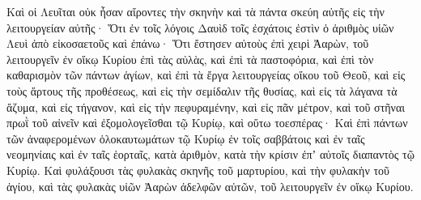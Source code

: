 {Καὶ οἱ Λευῖται οὐκ ἦσαν αἴροντες τὴν σκηνὴν καὶ τὰ πάντα σκεύη αὐτῆς εἰς τὴν λειτουργείαν αὐτῆς·
Ὅτι ἐν τοῖς λόγοις Δαυὶδ τοῖς ἐσχάτοις ἐστὶν ὁ ἀριθμὸς υἱῶν Λευὶ ἀπὸ εἰκοσαετοῦς καὶ ἐπάνω·
Ὅτι ἔστησεν αὐτοὺς ἐπὶ χειρὶ Ἀαρὼν, τοῦ λειτουργεῖν ἐν οἴκῳ Κυρίου ἐπὶ τὰς αὐλὰς, καὶ ἐπὶ τὰ παστοφόρια, καὶ ἐπὶ τὸν καθαρισμὸν τῶν πάντων ἁγίων, καὶ ἐπὶ τὰ ἔργα λειτουργείας οἴκου τοῦ Θεοῦ,
καὶ εἰς τοὺς ἄρτους τῆς προθέσεως, καὶ εἰς τὴν σεμίδαλιν τῆς θυσίας, καὶ εἰς τὰ λάγανα τὰ ἄζυμα, καὶ εἰς τήγανον, καὶ εἰς τὴν πεφυραμένην, καὶ εἰς πᾶν μέτρον,
καὶ τοῦ στῆναι πρωῒ τοῦ αἰνεῖν καὶ ἐξομολογεῖσθαι τῷ Κυρίῳ, καὶ οὕτω τοεσπέρας·
Καὶ ἐπὶ πάντων τῶν ἀναφερομένων ὁλοκαυτωμάτων τῷ Κυρίῳ ἐν τοῖς σαββάτοις καὶ ἐν ταῖς νεομηνίαις καὶ ἐν ταῖς ἑορταῖς, κατὰ ἀριθμὸν, κατὰ τὴν κρίσιν ἐπʼ αὐτοῖς διαπαντὸς τῷ Κυρίῳ.
Καὶ φυλάξουσι τὰς φυλακὰς σκηνῆς τοῦ μαρτυρίου, καὶ τὴν φυλακὴν τοῦ ἁγίου, καὶ τὰς φυλακὰς υἱῶν Ἀαρὼν ἀδελφῶν αὐτῶν, τοῦ λειτουργεῖν ἐν οἴκῳ Κυρίου.

}

